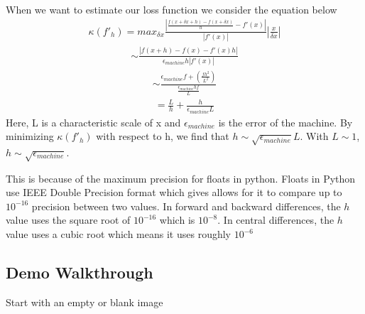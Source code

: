 \documentclass[letterpaper,10pt,english]{jupyterBook}
\begin{document}
\sphinxAtStartPar
When we want to estimate our loss function we consider the equation below
\begin{equation*}
\begin{split}\kappa(f'_h) = max_{\delta x} \frac{|\frac{f(x+\delta x + h) - f (x+\delta x)}{h} -f'(x)|}{|f'(x)|}|\frac{x}{\delta x}|\end{split}
\end{equation*}\begin{equation*}
\begin{split}\sim \frac{|f(x+h) - f(x) -f'(x)h|}{\epsilon_{machine}h|f'(x)|}\end{split}
\end{equation*}\begin{equation*}
\begin{split}\sim\frac{\epsilon_{machine}f +(\frac{fh^2}{L^2})}{\frac{\epsilon_{machine}hf}{L}}\end{split}
\end{equation*}\begin{equation*}
\begin{split} = \frac{L}{h} + \frac{h}{\epsilon_{machine}L}\end{split}
\end{equation*}
\sphinxAtStartPar
Here, L is a characteristic scale of x and \(\epsilon_{machine}\) is the error of the machine. By minimizing \(\kappa(f'_h)\) with respect to h, we find that \(h \sim \sqrt{\epsilon_{machine}}L\). With \(L\sim 1\), \(h \sim \sqrt{\epsilon_{machine}}\).

\sphinxAtStartPar
This is because of the maximum precision for floats in python. Floats in Python use IEEE Double Precision format which gives allows for it to compare up to \(10^{-16}\) precision between two values. In forward and backward differences, the \(h\) value uses the square root of \(10^{-16}\) which is \(10^{-8}\). In central differences, the \(h\) value uses a cubic root which means it uses roughly \(10^{-6}\)


\subsection{Demo Walkthrough}
\label{\detokenize{finite_gradient:demo-walkthrough}}
\sphinxAtStartPar
Start with an empty or blank image
\end{document}
